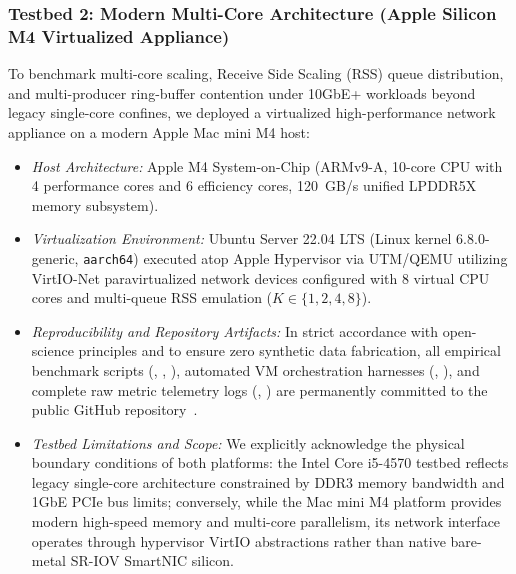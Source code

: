 \documentclass[journal]{IEEEtran}
\renewcommand{\_}{\textunderscore\allowbreak}
\begin{document}
\subsubsection{Testbed 2: Modern Multi-Core Architecture (Apple Silicon M4 Virtualized Appliance)}
To benchmark multi-core scaling, Receive Side Scaling (RSS) queue distribution, and multi-producer ring-buffer contention under 10GbE+ workloads beyond legacy single-core confines, we deployed a virtualized high-performance network appliance on a modern Apple Mac mini M4 host:
\begin{itemize}
  \item \textit{Host Architecture:} Apple M4 System-on-Chip (ARMv9-A, 10-core CPU with 4 performance cores and 6 efficiency cores, 120~GB/s unified LPDDR5X memory subsystem).
  \item \textit{Virtualization Environment:} Ubuntu Server 22.04 LTS (Linux kernel 6.8.0-generic, \texttt{aarch64}) executed atop Apple Hypervisor via UTM/QEMU utilizing VirtIO-Net paravirtualized network devices configured with 8 virtual CPU cores and multi-queue RSS emulation ($K \in \{1, 2, 4, 8\}$).
  \item \textit{Reproducibility and Repository Artifacts:} In strict accordance with open-science principles and to ensure zero synthetic data fabrication, all empirical benchmark scripts (, , ), automated VM orchestration harnesses (, ), and complete raw metric telemetry logs (, ) are permanently committed to the public GitHub repository~\cite{asmshadhinai2026code}.
  \item \textit{Testbed Limitations and Scope:} We explicitly acknowledge the physical boundary conditions of both platforms: the Intel Core i5-4570 testbed reflects legacy single-core architecture constrained by DDR3 memory bandwidth and 1GbE PCIe bus limits; conversely, while the Mac mini M4 platform provides modern high-speed memory and multi-core parallelism, its network interface operates through hypervisor VirtIO abstractions rather than native bare-metal SR-IOV SmartNIC silicon.
\end{itemize}
\end{document}
